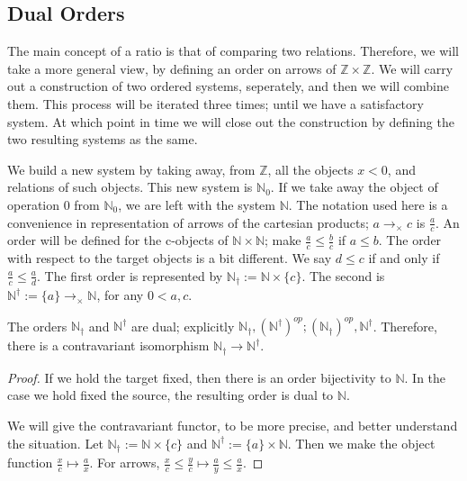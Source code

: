\documentclass [12pt]{book}
\begin{document}
		\subsection{Dual Orders}

The main concept of a ratio is that of comparing two relations. Therefore, we will take a more general view, by defining an order on arrows of $\mathbb{Z}\times\mathbb Z$. We will carry out a construction of two ordered systems, seperately, and then we will combine them. This process will be iterated three times; until we have a satisfactory system. At which point in time we will close out the construction by defining the two resulting systems as the same. 

We build a new system by taking away, from $\mathbb Z$, all the objects $x<0$, and relations of such objects. This new system is $\mathbb{N}_{0}$. If we take away the object of operation $0$ from $\mathbb{N}_{0}$, we are left with the system $\mathbb{N}$. The notation used here is a convenience in representation of arrows of the cartesian products; $a\rightarrow_{\times}c$ is $\frac{a}{c}$. An order will be defined for the c-objects of $\mathbb{N}\times\mathbb{N}$; make $\frac{a}{c}\leq\frac{b}{c}$ if $a\leq b$. The order with respect to the target objects is a bit different. We say $d\leq c$ if and only if $\frac{a}{c}\leq\frac{a}{d}$. The first order is represented by $\mathbb N_\dagger:=\mathbb N\times\{c\}$. The second is $\mathbb N^\dagger:=\{a\}\rightarrow_\times\mathbb N$, for any $0<a,c$.

\begin{proposition}The orders $\mathbb N_\dagger$ and $\mathbb N^\dagger$ are dual; explicitly $\mathbb N_\dagger,(\mathbb N^{\dagger})^{op};(\mathbb N_\dagger)^{op},\mathbb N^\dagger$. Therefore, there is a contravariant isomorphism $\mathbb N_\dagger\rightarrow\mathbb N^\dagger$.\end{proposition}

\begin{proof}If we hold the target fixed, then there is an order bijectivity to $\mathbb N$. In the case we hold fixed the source, the resulting order is dual to $\mathbb N$.

We will give the contravariant functor, to be more precise, and better understand the situation. Let $\mathbb N_\dagger:=\mathbb N\times\{c\}$ and $\mathbb N^\dagger:=\{a\}\times\mathbb N$. Then we make the object function $\frac xc\mapsto\frac ax$. For arrows, $\frac xc\leq\frac yc\mapsto\frac ay\leq\frac ax$.\end{proof}
\end{document}
